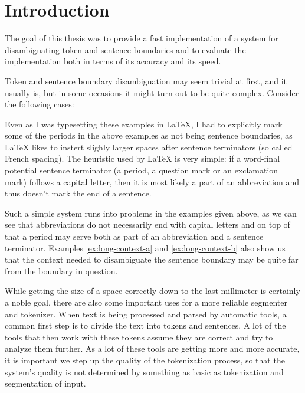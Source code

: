 \chapter*{Introduction}

The goal of this thesis was to provide a fast implementation of a system for
disambiguating token and sentence boundaries and to evaluate the
implementation both in terms of its accuracy and its speed.

Token and sentence boundary disambiguation may seem trivial at first, and it
usually is, but in some occasions it might turn out to be quite complex.
Consider the following cases:

\begin{exe}
\end{exe}

Even as I was typesetting these examples in \LaTeX{}, I had to explicitly mark
some of the periods in the above examples as not being sentence boundaries, as
\LaTeX{} likes to instert slighly larger spaces after sentence terminators (so
called French spacing). The heuristic used by \LaTeX{} is very simple: if a
word-final potential sentence terminator (a period, a question mark or an
exclamation mark) follows a capital letter, then it is most likely a part of
an abbreviation and thus doesn't mark the end of a sentence.

Such a simple system runs into problems in the examples given above, as we
can see that abbreviations do not necessarily end with capital letters and on
top of that a period may serve both as part of an abbreviation and a sentence
terminator. Examples \ref{ex:long-context-a} and \ref{ex:long-context-b} also
show us that the context needed to disambiguate the sentence boundary may be
quite far from the boundary in question.

While getting the size of a space correctly down to the last millimeter is
certainly a noble goal, there are also some important uses for a more reliable
segmenter and tokenizer. When text is being processed and parsed by automatic
tools, a common first step is to divide the text into tokens and sentences. A
lot of the tools that then work with these tokens assume they are correct and
try to analyze them further. As a lot of these tools are getting more and more
accurate, it is important we step up the quality of the tokenization process,
so that the system's quality is not determined by something as basic as
tokenization and segmentation of input. 

